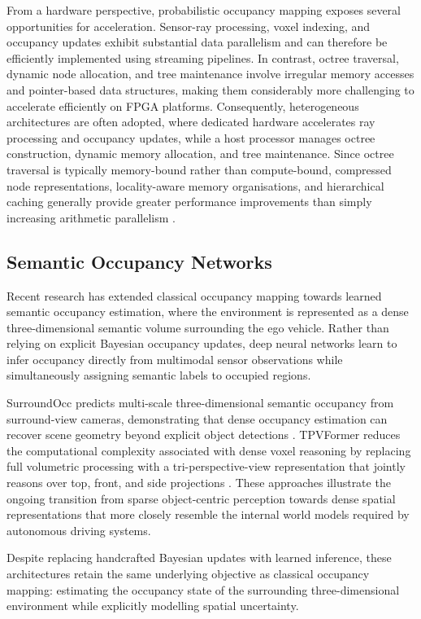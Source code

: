 \documentclass[11pt,oneside,openany]{book}
\begin{document}
From a hardware perspective, probabilistic occupancy mapping exposes several opportunities for acceleration. Sensor-ray processing, voxel indexing, and occupancy updates exhibit substantial data parallelism and can therefore be efficiently implemented using streaming pipelines. In contrast, octree traversal, dynamic node allocation, and tree maintenance involve irregular memory accesses and pointer-based data structures, making them considerably more challenging to accelerate efficiently on FPGA platforms. Consequently, heterogeneous architectures are often adopted, where dedicated hardware accelerates ray processing and occupancy updates, while a host processor manages octree construction, dynamic memory allocation, and tree maintenance. Since octree traversal is typically memory-bound rather than compute-bound, compressed node representations, locality-aware memory organisations, and hierarchical caching generally provide greater performance improvements than simply increasing arithmetic parallelism \cite{jia2022_omu}.

\subsection{Semantic Occupancy Networks}

Recent research has extended classical occupancy mapping towards learned semantic occupancy estimation, where the environment is represented as a dense three-dimensional semantic volume surrounding the ego vehicle. Rather than relying on explicit Bayesian occupancy updates, deep neural networks learn to infer occupancy directly from multimodal sensor observations while simultaneously assigning semantic labels to occupied regions.

SurroundOcc predicts multi-scale three-dimensional semantic occupancy from surround-view cameras, demonstrating that dense occupancy estimation can recover scene geometry beyond explicit object detections \cite{wei2023_surroundocc}. TPVFormer reduces the computational complexity associated with dense voxel reasoning by replacing full volumetric processing with a tri-perspective-view representation that jointly reasons over top, front, and side projections \cite{huang2023_tpvformer}. These approaches illustrate the ongoing transition from sparse object-centric perception towards dense spatial representations that more closely resemble the internal world models required by autonomous driving systems.

Despite replacing handcrafted Bayesian updates with learned inference, these architectures retain the same underlying objective as classical occupancy mapping: estimating the occupancy state of the surrounding three-dimensional environment while explicitly modelling spatial uncertainty.
\end{document}
